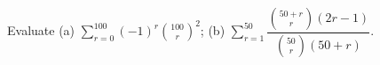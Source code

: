 Evaluate (a) $\sum_{r=0}^{100}(-1)^r\binom{100}r^2$; (b) $\sum_{r=1}^{50}\dfrac{\binom{50+r}r(2r-1)}{\binom{50}r(50+r)}$.
